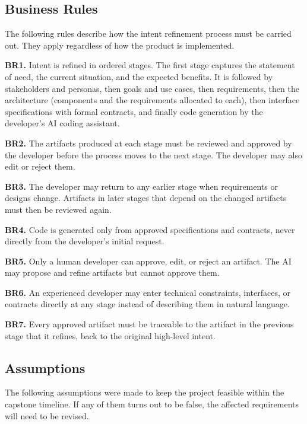 \documentclass[12pt]{article}
\begin{document}
\subsection{Business Rules}

The following rules describe how the intent refinement process must be carried
out. They apply regardless of how the product is implemented.

\medskip
\noindent\textbf{BR1.} Intent is refined in ordered stages. The first stage
captures the statement of need, the current situation, and the expected
benefits. It is followed by stakeholders and personas, then goals and use cases,
then requirements, then the architecture (components and the requirements
allocated to each), then interface specifications with formal contracts, and
finally code generation by the developer's AI coding assistant.

\medskip
\noindent\textbf{BR2.} The artifacts produced at each stage must be reviewed and
approved by the developer before the process moves to the next stage. The
developer may also edit or reject them.

\medskip
\noindent\textbf{BR3.} The developer may return to any earlier stage when
requirements or designs change. Artifacts in later stages that depend on the
changed artifacts must then be reviewed again.

\medskip
\noindent\textbf{BR4.} Code is generated only from approved specifications and
contracts, never directly from the developer's initial request.

\medskip
\noindent\textbf{BR5.} Only a human developer can approve, edit, or reject an
artifact. The AI may propose and refine artifacts but cannot approve them.

\medskip
\noindent\textbf{BR6.} An experienced developer may enter technical constraints,
interfaces, or contracts directly at any stage instead of describing them in
natural language.

\medskip
\noindent\textbf{BR7.} Every approved artifact must be traceable to the
artifact in the previous stage that it refines, back to the original
high-level intent.

\subsection{Assumptions}

The following assumptions were made to keep the project feasible within the
capstone timeline. If any of them turns out to be false, the affected
requirements will need to be revised.
\end{document}
